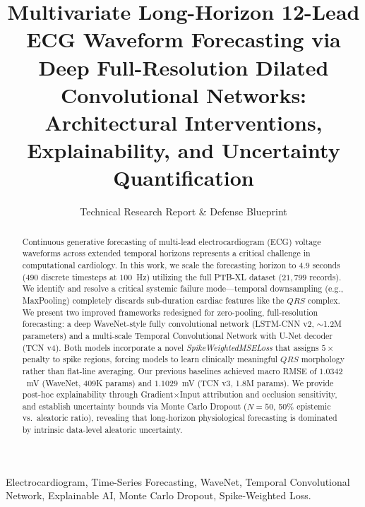 \documentclass[10pt,journal,compsoc]{IEEEtran}
\begin{document}
\title{Multivariate Long-Horizon 12-Lead ECG Waveform Forecasting via Deep Full-Resolution Dilated Convolutional Networks: Architectural Interventions, Explainability, and Uncertainty Quantification}

\author{Technical Research Report \& Defense Blueprint}

\maketitle

\begin{abstract}
Continuous generative forecasting of multi-lead electrocardiogram (ECG) voltage waveforms across extended temporal horizons represents a critical challenge in computational cardiology. In this work, we scale the forecasting horizon to $4.9$ seconds ($490$ discrete timesteps at $100$~Hz) utilizing the full PTB-XL dataset ($21,799$ records). We identify and resolve a critical systemic failure mode---temporal downsampling (e.g., MaxPooling) completely discards sub-duration cardiac features like the $QRS$ complex. We present two improved frameworks redesigned for zero-pooling, full-resolution forecasting: a deep WaveNet-style fully convolutional network (LSTM-CNN v2, $\sim$1.2M parameters) and a multi-scale Temporal Convolutional Network with U-Net decoder (TCN v4). Both models incorporate a novel \textit{SpikeWeightedMSELoss} that assigns $5\times$ penalty to spike regions, forcing models to learn clinically meaningful $QRS$ morphology rather than flat-line averaging. Our previous baselines achieved macro RMSE of $1.0342$~mV (WaveNet, 409K params) and $1.1029$~mV (TCN v3, 1.8M params). We provide post-hoc explainability through Gradient$\times$Input attribution and occlusion sensitivity, and establish uncertainty bounds via Monte Carlo Dropout ($N=50$, 50\% epistemic vs.\ aleatoric ratio), revealing that long-horizon physiological forecasting is dominated by intrinsic data-level aleatoric uncertainty.
\end{abstract}

\begin{IEEEkeywords}
Electrocardiogram, Time-Series Forecasting, WaveNet, Temporal Convolutional Network, Explainable AI, Monte Carlo Dropout, Spike-Weighted Loss.
\end{IEEEkeywords}

\end{document}
